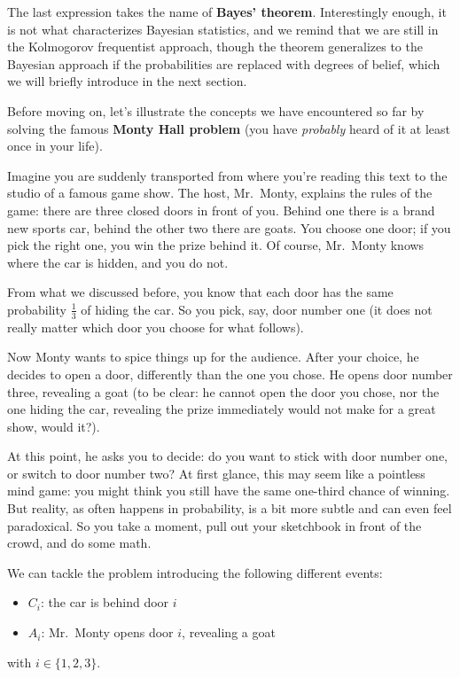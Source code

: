The last expression takes the name of \textbf{Bayes' theorem}. Interestingly enough, it is not what characterizes Bayesian statistics, and we remind that we are still in the Kolmogorov frequentist approach, though the theorem generalizes to the Bayesian approach if the probabilities are replaced with degrees of belief, which we will briefly introduce in the next section.

\begin{example}
	Before moving on, let's illustrate the concepts we have encountered so far by solving the famous \textbf{Monty Hall problem} (you have \emph{probably} heard of it at least once in your life).
	
	Imagine you are suddenly transported from where you're reading this text to the studio of a famous game show. The host, Mr.~Monty, explains the rules of the game: there are three closed doors in front of you. Behind one there is a brand new sports car, behind the other two there are goats. You choose one door; if you pick the right one, you win the prize behind it. Of course, Mr.~Monty knows where the car is hidden, and you do not.
	
	From what we discussed before, you know that each door has the same probability $\frac{1}{3}$ of hiding the car. So you pick, say, door number one (it does not really matter which door you choose for what follows).
	
	Now Monty wants to spice things up for the audience. After your choice, he decides to open a door, differently than the one you chose. He opens door number three, revealing a goat (to be clear: he cannot open the door you chose, nor the one hiding the car, revealing the prize immediately would not make for a great show, would it?).
	
	At this point, he asks you to decide: do you want to stick with door number one, or switch to door number two?
	At first glance, this may seem like a pointless mind game: you might think you still have the same one-third chance of winning. But reality, as often happens in probability, is a bit more subtle and can even feel paradoxical. So you take a moment, pull out your sketchbook in front of the crowd, and do some math.
	
	We can tackle the problem introducing the following different events:
	\begin{itemize}
		\item $C_i$: the car is behind door $i$
		\item $A_i$: Mr.~Monty opens door $i$, revealing a goat
	\end{itemize}
	with $i \in \{1,2,3\}$.
	

\end{example}
